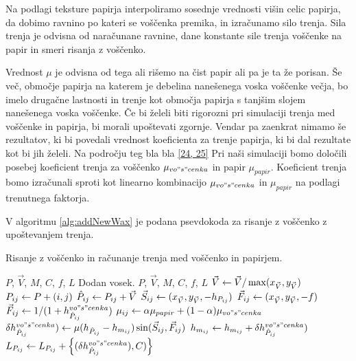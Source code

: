 Na podlagi teksture papirja interpoliramo sosednje vrednosti višin celic papirja, da dobimo ravnino po kateri se voščenka premika, in izračunamo silo trenja. Sila trenja je odvisna od naračunane ravnine, dane konstante sile trenja voščenke na papir in smeri risanja z voščenko.

Vrednost $\mu$ je odvisna od tega ali rišemo na čist papir ali pa je ta že porisan. Še več, območje papirja na katerem je debelina nanešenega voska voščenke večja, bo imelo drugačne lastnosti in trenje kot območja papirja s tanjšim slojem nanešenega voska voščenke. %
Če bi želeli biti rigorozni pri simulaciji trenja med voščenke in papirja, bi morali upoštevati zgornje. Vendar pa zaenkrat nimamo še rezultatov, ki bi povedali vrednost koeficienta za trenje papirja, ki bi dal rezultate kot bi jih želeli. Na področju teg bla bla \ref{24, 25} %
Pri naši simulaciji bomo določili posebej koeficient trenja za voščenko $\mu_{vo"s"cenka}$ in papir $\mu_{papir}$. Koeficient trenja bomo izračunali sproti kot linearno kombinacijo $\mu_{vo"s"cenka}$ in $\mu_{papir}$ na podlagi trenutnega faktorja.

V algoritmu \ref{alg:addNewWax} je podana psevdokoda za risanje z voščenko z upoštevanjem trenja.

%
\begin{algorithm}[htb]
  \caption{Risanje z voščenko in računanje trenja med voščenko in papirjem.}
  \label{alg:addNewWax}
\begin{algorithmic}[1]
\Require $P$, $\vec{V}$, $M$, $C$, $f$, $L$
\Ensure Dodan vosek. %
 {$P$, $\vec{V}$, $M$, $C$, $f$, $L$} %
  \State $\vec{V} \gets \vec{V}/\max (x_{\vec{V}}, y_{\vec{V}})$
      \State $P_{ij} \gets P + (i, j)$
      \State $\hat{P}_{ij} \gets P_{ij} + \vec{V}$
      \State $\vec{S}_{ij} \gets (x_{\vec{V}}, y_{\vec{V}}, -h_{P_{ij}})$
      \State $\vec{F}_{ij} \gets (x_{\vec{V}}, y_{\vec{V}}, -f)$
      \State $\vec{F}_{ij} \gets 1/(1 + h_{\hat{P}_{ij}}^{vo"s"cenka})$
      \State $\mu_{ij} \gets \alpha \mu_{papir} + (1 - \alpha) \mu_{vo"s"cenka}$
      \State $\delta h_{\hat{P}_{ij}}^{vo"s"cenka}) \gets \mu (h_{\hat{P}_{ij}} - h_{m_{ij}}) \sin (\vec{S}_{ij}, \vec{F}_{ij})$
      \State $h_{m_{ij}} \gets h_{m_{ij}} + \delta h_{\hat{P}_{ij}}^{vo"s"cenka})$ %
      \State $L_{P_{ij}} \gets L_{P_{ij}} + \left\{(\delta h_{\hat{P}_{ij}}^{vo"s"cenka}), C)\right\}$
  \EndFor
\EndFunction
\end{algorithmic}
\end{algorithm}
%
